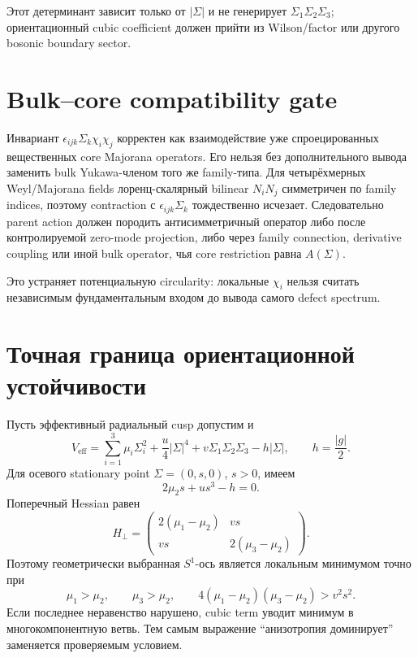 Этот детерминант зависит только от \(|\Sigma|\) и не генерирует
\(\Sigma_1\Sigma_2\Sigma_3\); ориентационный cubic coefficient должен прийти
из Wilson/factor или другого bosonic boundary sector.

\section{Bulk--core compatibility gate}

Инвариант \(\epsilon_{ijk}\Sigma_k\chi_i\chi_j\) корректен как взаимодействие
уже спроецированных вещественных core Majorana operators. Его нельзя без
дополнительного вывода заменить bulk Yukawa-членом того же family-типа.
Для четырёхмерных Weyl/Majorana fields лоренц-скалярный bilinear
\(N_iN_j\) симметричен по family indices, поэтому contraction с
\(\epsilon_{ijk}\Sigma_k\) тождественно исчезает. Следовательно parent action
должен породить антисимметричный оператор либо после контролируемой
zero-mode projection, либо через family connection, derivative coupling или
иной bulk operator, чья core restriction равна \(A(\Sigma)\).

Это устраняет потенциальную circularity: локальные \(\chi_i\) нельзя считать
независимым фундаментальным входом до вывода самого defect spectrum.

\section{Точная граница ориентационной устойчивости}

Пусть эффективный радиальный cusp допустим и
\begin{equation}
 V_{\mathrm{eff}}=
 \sum_{i=1}^{3}\mu_i\Sigma_i^2+
 \frac u4|\Sigma|^4+v\Sigma_1\Sigma_2\Sigma_3-h|\Sigma|,
 \qquad h=\frac{|g|}{2}.
\end{equation}
Для осевого stationary point \(\Sigma=(0,s,0)\), \(s>0\), имеем
\begin{equation}
 2\mu_2s+us^3-h=0.
\end{equation}
Поперечный Hessian равен
\begin{equation}
 H_\perp=
 \begin{pmatrix}
 2(\mu_1-\mu_2) & vs\\
 vs & 2(\mu_3-\mu_2)
 \end{pmatrix}.
\end{equation}
Поэтому геометрически выбранная \(S^1\)-ось является локальным минимумом
точно при
\begin{equation}
 \mu_1>\mu_2,
 \qquad
 \mu_3>\mu_2,
 \qquad
 4(\mu_1-\mu_2)(\mu_3-\mu_2)>v^2s^2.
\end{equation}
Если последнее неравенство нарушено, cubic term уводит минимум в
многокомпонентную ветвь. Тем самым выражение ``анизотропия доминирует''
заменяется проверяемым условием.


